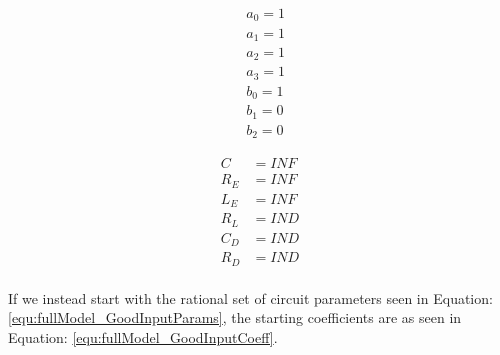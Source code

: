 \begin{multicols}{2}
    \mbox{}\vfill
    \begin{equation}
        \label{equ:fullModel_BadInputCoeff}
        \begin{split}
            &a_0 = 1 \\
            &a_1 = 1 \\
            &a_2 = 1 \\
            &a_3 = 1 \\
            &b_0 = 1 \\
            &b_1 = 0 \\
            &b_2 = 0
        \end{split}
    \end{equation}

    \mbox{}\vfill
    \columnbreak

    \mbox{}\vfill
    \begin{equation}
        \label{equ:fullModel_BadInputParams}
        \begin{split}
             C   &= INF \\
             R_E &= INF \\
             L_E &= INF \\
             R_L &= IND \\
             C_D &= IND \\
             R_D &= IND \\
        \end{split}
    \end{equation}
    \mbox{}\vfill
\end{multicols}



If we instead start with the rational set of circuit parameters seen in Equation: \eqref{equ:fullModel_GoodInputParams}, the starting coefficients are as seen in Equation: \eqref{equ:fullModel_GoodInputCoeff}.

